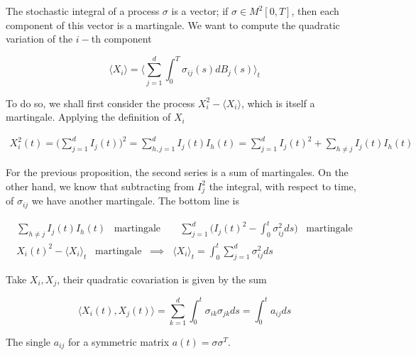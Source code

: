 The stochastic integral of a process $\sigma$ is a vector; if $\sigma \in M^2[0,T]$, then each component of this vector is a martingale. We want to compute the quadratic variation of the $i-$th component

\begin{equation*}
    \langle X_i \rangle = \Big\langle \sum_{j=1}^d \int_0^T \sigma_{ij}(s) dB_j(s) \Big\rangle_t
\end{equation*}

To do so, we shall first consider the process $X_i^2 - \langle X_i \rangle$, which is itself a martingale. Applying the definition of $X_i$

\begin{gather*}
    X_i^2(t) = \Bigg( \sum_{j=1}^d I_j(t) \Bigg)^2 = \sum_{h,j = 1}^d I_j(t) I_h(t) = \sum_{j=1}^d I_j(t)^2 + \sum_{h \neq j} I_j(t) I_h(t)
\end{gather*}

For the previous proposition, the second series is a sum of martingales. On the other hand, we know that subtracting from $I_j^2$ the integral, with respect to time, of $\sigma_{ij}$ we have another martingale. The bottom line is

\begin{gather*}
    \sum_{h \neq j} I_j(t)I_h(t) \;\;\; \text{martingale} \;\;\;\;\;\;\; \sum_{j=1}^d \Bigg( I_j(t)^2 - \int_0^t \sigma_{ij}^2 ds \Bigg) \;\;\; \text{martingale} \\
    X_i(t)^2 - \langle X_i \rangle_t \;\;\; \text{martingale} \;\; \implies \;\; \langle X_i \rangle_t = \int_0^t \sum_{j=1}^d \sigma_{ij}^2 ds 
\end{gather*}

Take $X_i,X_j$, their quadratic covariation is given by the sum

\begin{equation*}
    \big\langle X_i(t), X_j(t) \big\rangle = \sum_{k=1}^d \int_0^t \sigma_{ik} \sigma_{jk} ds = \int_0^t a_{ij} ds
\end{equation*}

The single $a_{ij}$ for a symmetric matrix $a(t) = \sigma \sigma^T$.

